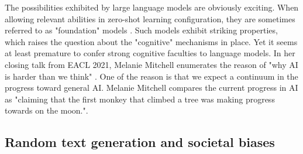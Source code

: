 The possibilities exhibited by large language models are obviously exciting. When allowing relevant abilities in zero-shot learning configuration, they are sometimes referred to as "foundation" models \parencite{bommasani_21}. Such models exhibit striking properties, which raises the question about the "cognitive" mechanisms in place. 
Yet it seems at least premature to confer strong cognitive faculties to language models. In her closing talk from EACL 2021, Melanie Mitchell enumerates the reason of "why AI is harder than we think" \parencite{mitchell_21}. One of the reason is that we expect a continuum in the progress toward general AI. Melanie Mitchell compares the current progress in AI as "claiming that the first monkey that climbed a tree was making progress towards on the moon.".


\subsection{Random text generation and societal biases} 

